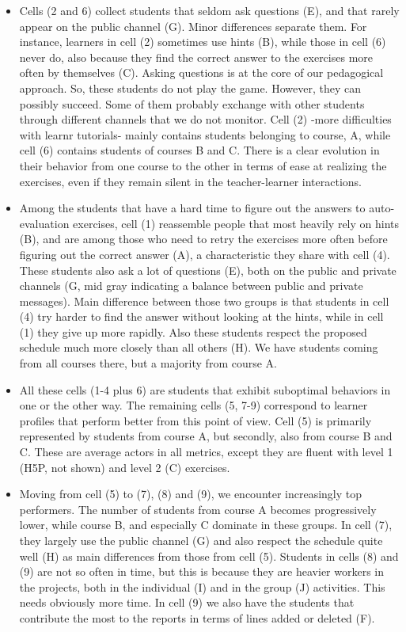 \documentclass{aims}
\theoremstyle{definition}
\begin{document}
\begin{itemize}
\item
  Cells (2 and 6) collect students that seldom ask questions (E), and
  that rarely appear on the public channel (G). Minor differences
  separate them. For instance, learners in cell (2) sometimes use hints
  (B), while those in cell (6) never do, also because they find the
  correct answer to the exercises more often by themselves (C). Asking
  questions is at the core of our pedagogical approach. So, these
  students do not play the game. However, they can possibly succeed.
  Some of them probably exchange with other students through different
  channels that we do not monitor. Cell (2) -more difficulties with
  learnr tutorials- mainly contains students belonging to course, A,
  while cell (6) contains students of courses B and C. There is a clear
  evolution in their behavior from one course to the other in terms of
  ease at realizing the exercises, even if they remain silent in the
  teacher-learner interactions.
\item
  Among the students that have a hard time to figure out the answers to
  auto-evaluation exercises, cell (1) reassemble people that most
  heavily rely on hints (B), and are among those who need to retry the
  exercises more often before figuring out the correct answer (A), a
  characteristic they share with cell (4). These students also ask a lot
  of questions (E), both on the public and private channels (G, mid gray
  indicating a balance between public and private messages). Main
  difference between those two groups is that students in cell (4) try
  harder to find the answer without looking at the hints, while in cell
  (1) they give up more rapidly. Also these students respect the
  proposed schedule much more closely than all others (H). We have
  students coming from all courses there, but a majority from course A.
\item
  All these cells (1-4 plus 6) are students that exhibit suboptimal
  behaviors in one or the other way. The remaining cells (5, 7-9)
  correspond to learner profiles that perform better from this point of
  view. Cell (5) is primarily represented by students from course A, but
  secondly, also from course B and C. These are average actors in all
  metrics, except they are fluent with level 1 (H5P, not shown) and
  level 2 (C) exercises.
\item
  Moving from cell (5) to (7), (8) and (9), we encounter increasingly
  top performers. The number of students from course A becomes
  progressively lower, while course B, and especially C dominate in
  these groups. In cell (7), they largely use the public channel (G) and
  also respect the schedule quite well (H) as main differences from
  those from cell (5). Students in cells (8) and (9) are not so often in
  time, but this is because they are heavier workers in the projects,
  both in the individual (I) and in the group (J) activities. This needs
  obviously more time. In cell (9) we also have the students that
  contribute the most to the reports in terms of lines added or deleted
  (F).
\end{itemize}
\end{document}
